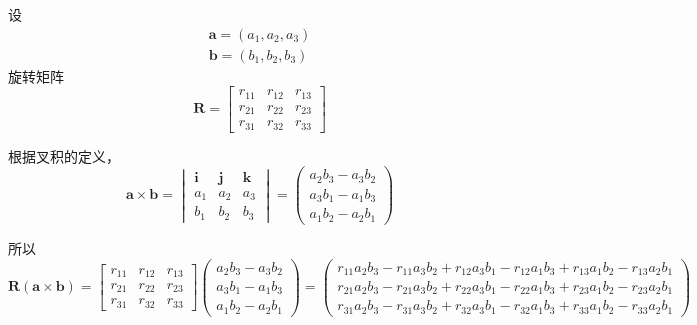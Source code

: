 \documentclass{homework}
\begin{document}
\begin{sol}
  设
  \begin{align*}
    \mathbf{a} = (a_1, a_2, a_3) \\
    \mathbf{b} = (b_1, b_2, b_3)
  \end{align*}
  旋转矩阵
  \[
    \mathbf{R} = 
    \begin{bmatrix}
      r_{11} & r_{12} & r_{13} \\
      r_{21} & r_{22} & r_{23} \\
      r_{31} & r_{32} & r_{33}
    \end{bmatrix}
  \]

  根据叉积的定义，
  \[
    \mathbf{a} \times \mathbf{b} = 
    \begin{vmatrix}
      \mathbf{i} & \mathbf{j} & \mathbf{k} \\
      a_1 & a_2 & a_3 \\
      b_1 & b_2 & b_3
    \end{vmatrix}
    = 
    \begin{pmatrix}  
      a_2 b_3 - a_3 b_2 \\
      a_3 b_1 - a_1 b_3 \\
      a_1 b_2 - a_2 b_1
    \end{pmatrix}
  \]

  所以
  \[
    \mathbf{R} (\mathbf{a} \times \mathbf{b})= 
    \begin{bmatrix}
      r_{11} & r_{12} & r_{13} \\
      r_{21} & r_{22} & r_{23} \\
      r_{31} & r_{32} & r_{33}
    \end{bmatrix}
    \begin{pmatrix}  
      a_2 b_3 - a_3 b_2 \\
      a_3 b_1 - a_1 b_3 \\
      a_1 b_2 - a_2 b_1
    \end{pmatrix}
    =
    \begin{pmatrix}  
      r_{11} a_2 b_3 - r_{11} a_3 b_2 + r_{12} a_3 b_1 - r_{12} a_1 b_3 + r_{13} a_1 b_2 - r_{13} a_2 b_1 \\
      r_{21} a_2 b_3 - r_{21} a_3 b_2 + r_{22} a_3 b_1 - r_{22} a_1 b_3 + r_{23} a_1 b_2 - r_{23} a_2 b_1 \\
      r_{31} a_2 b_3 - r_{31} a_3 b_2 + r_{32} a_3 b_1 - r_{32} a_1 b_3 + r_{33} a_1 b_2 - r_{33} a_2 b_1
    \end{pmatrix}
  \]


\end{sol}
\end{document}
